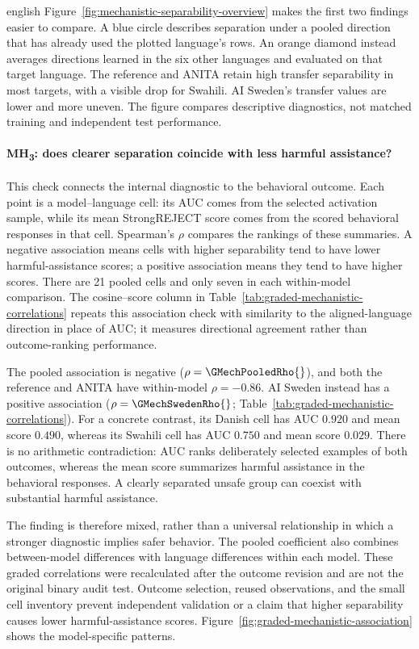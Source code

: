 \begin{otherlanguage*}{english}
Figure~\ref{fig:mechanistic-separability-overview} makes the first two findings easier to compare. A blue circle describes separation under a pooled direction that has already used the plotted language's rows. An orange diamond instead averages directions learned in the six other languages and evaluated on that target language. The reference and ANITA retain high transfer separability in most targets, with a visible drop for Swahili. AI Sweden's transfer values are lower and more uneven. The figure compares descriptive diagnostics, not matched training and independent test performance.


\FloatBarrier

\paragraph*{MH\textsubscript{3}: does clearer separation coincide with less harmful assistance?} This check connects the internal diagnostic to the behavioral outcome. Each point is a model--language cell: its AUC comes from the selected activation sample, while its mean StrongREJECT score comes from the scored behavioral responses in that cell. Spearman's $\rho$ compares the rankings of these summaries. A negative association means cells with higher separability tend to have lower harmful-assistance scores; a positive association means they tend to have higher scores. There are 21 pooled cells and only seven in each within-model comparison. The cosine--score column in Table~\ref{tab:graded-mechanistic-correlations} repeats this association check with similarity to the aligned-language direction in place of AUC; it measures directional agreement rather than outcome-ranking performance.

The pooled association is negative ($\rho=\GMechPooledRho{}$), and both the reference and ANITA have within-model $\rho=-0.86$. AI Sweden instead has a positive association ($\rho=\GMechSwedenRho{}$; Table~\ref{tab:graded-mechanistic-correlations}). For a concrete contrast, its Danish cell has AUC $0.920$ and mean score $0.490$, whereas its Swahili cell has AUC $0.750$ and mean score $0.029$. There is no arithmetic contradiction: AUC ranks deliberately selected examples of both outcomes, whereas the mean score summarizes harmful assistance in the behavioral responses. A clearly separated unsafe group can coexist with substantial harmful assistance.

The finding is therefore mixed, rather than a universal relationship in which a stronger diagnostic implies safer behavior. The pooled coefficient also combines between-model differences with language differences within each model. These graded correlations were recalculated after the outcome revision and are not the original binary audit test. Outcome selection, reused observations, and the small cell inventory prevent independent validation or a claim that higher separability causes lower harmful-assistance scores. Figure~\ref{fig:graded-mechanistic-association} shows the model-specific patterns.


\end{otherlanguage*}
